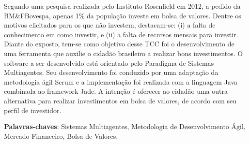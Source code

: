 \begin{resumo}
 


 \vspace{\onelineskip}
    Segundo uma pesquisa realizada pelo Instituto Rosenfield em 2012, a pedido da BM\&FBovespa, apenas 1\% da população investe em bolsa de valores. Dentre os motivos elicitados para os que não investem, destacam-se: (i) a falta de conhecimento em como investir, e (ii) a falta de recursos mensais para investir. Diante do exposto, tem-se como objetivo desse TCC foi o desenvolvimento de uma ferramenta que auxilie o cidadão brasileiro a realizar bons investimentos. O software a ser desenvolvido está orientado pelo Paradigma de Sistemas Multiagentes. Seu desenvolvimento foi conduzido por uma adaptação da metodologia ágil Scrum e a implementação foi realizada com a linguagem Java combinada ao framework Jade. A intenção é oferecer ao cidadão uma outra alternativa para realizar investimentos em bolsa de valores, de acordo com seu perfil de investidor.

    
 \noindent
 \textbf{Palavras-chaves}: Sistemas Multiagentes, Metodologia de Desenvolvimento Ágil, Mercado Financeiro, Bolsa de Valores.
\end{resumo}
